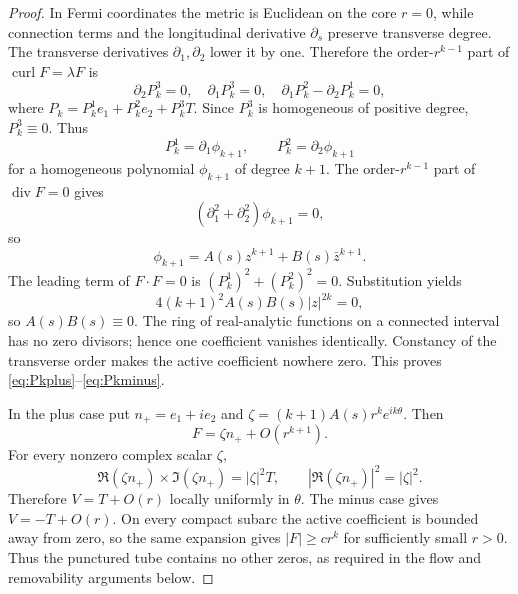 \documentclass[aps,prd,reprint,nofootinbib,superscriptaddress]{revtex4-2}
\theoremstyle{definition}
\theoremstyle{remark}
\newcommand{\Div}{\operatorname{div}}
\newcommand{\Curl}{\operatorname{curl}}
\begin{document}
\begin{proof}
In Fermi coordinates the metric is Euclidean on the core $r=0$, while connection terms and the longitudinal derivative $\partial_s$ preserve transverse degree. The transverse derivatives $\partial_1,\partial_2$ lower it by one. Therefore the order-$r^{k-1}$ part of $\Curl F=\lambda F$ is
\begin{equation}
\partial_2P_k^3=0,
\quad
\partial_1P_k^3=0,
\quad
\partial_1P_k^2-\partial_2P_k^1=0,
\label{eq:transversecurl}
\end{equation}
where $P_k=P_k^1e_1+P_k^2e_2+P_k^3T$. Since $P_k^3$ is homogeneous of positive degree, $P_k^3\equiv0$. Thus
\begin{equation}
P_k^1=\partial_1\phi_{k+1},
\qquad
P_k^2=\partial_2\phi_{k+1}
\label{eq:transversepotential}
\end{equation}
for a homogeneous polynomial $\phi_{k+1}$ of degree $k+1$. The order-$r^{k-1}$ part of $\Div F=0$ gives
\[
(\partial_1^2+\partial_2^2)\phi_{k+1}=0,
\]
so
\begin{equation}
\phi_{k+1}=A(s)z^{k+1}+B(s)\bar z^{k+1}.
\label{eq:2Dharmonic}
\end{equation}
The leading term of $F\cdot F=0$ is $(P_k^1)^2+(P_k^2)^2=0$. Substitution yields
\begin{equation}
4(k+1)^2A(s)B(s)|z|^{2k}=0,
\label{eq:ABzero}
\end{equation}
so $A(s)B(s)\equiv0$. The ring of real-analytic functions on a connected interval has no zero divisors; hence one coefficient vanishes identically. Constancy of the transverse order makes the active coefficient nowhere zero. This proves \eqref{eq:Pkplus}--\eqref{eq:Pkminus}.

In the plus case put $n_+=e_1+ie_2$ and $\zeta=(k+1)A(s)r^ke^{ik\theta}$. Then
\begin{equation}
F=\zeta n_+ +O(r^{k+1}).
\label{eq:transverseFlead}
\end{equation}
For every nonzero complex scalar $\zeta$,
\begin{equation}
\Re(\zeta n_+)\times\Im(\zeta n_+)=|\zeta|^2T,
\qquad
|\Re(\zeta n_+)|^2=|\zeta|^2.
\label{eq:phasecancel}
\end{equation}
Therefore $V=T+O(r)$ locally uniformly in $\theta$. The minus case gives $V=-T+O(r)$. On every compact subarc the active coefficient is bounded away from zero, so the same expansion gives $|F|\ge c r^k$ for sufficiently small $r>0$. Thus the punctured tube contains no other zeros, as required in the flow and removability arguments below.
\end{proof}
\end{document}
